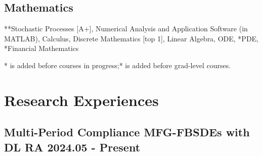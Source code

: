 \documentclass[a4paper]{article}
\newcommand{\mygray}{\color{lg}}
\begin{document}
\subsection{Mathematics} 
**Stochastic Processes [A+], Numerical Analysis and Application Software (in MATLAB), Calculus, Discrete Mathematics [top 1], Linear Algebra, ODE, *PDE, *Financial Mathematics

{\mygray
* is added before courses in progress;\hfill ** is added before grad-level courses.}

\section{Research Experiences}  %

\hypertarget{FBSDEs}{
    \subsection{Multi-Period Compliance MFG-FBSDEs with DL \normalfont \hfill RA \hspace{70pt} 2024.05 - Present}}
    
\end{document}
